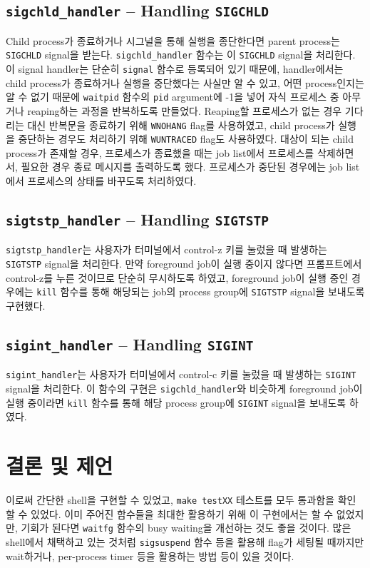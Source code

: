 \documentclass{scrartcl}
\begin{document}
\subsection{\texttt{sigchld\_handler} -- Handling \texttt{SIGCHLD}}
Child process가 종료하거나 시그널을 통해 실행을 종단한다면 parent process는
\texttt{SIGCHLD} signal을 받는다. \texttt{sigchld\_handler} 함수는 이
\texttt{SIGCHLD} signal을 처리한다. 이 signal handler는 단순히 \texttt{signal}
함수로 등록되어 있기 때문에, handler에서는 child process가 종료하거나 실행을
중단했다는 사실만 알 수 있고, 어떤 process인지는 알 수 없기 때문에
\texttt{waitpid} 함수의 \texttt{pid} argument에 -1을 넣어 자식 프로세스 중
아무거나 reaping하는 과정을 반복하도록 만들었다. Reaping할 프로세스가 없는 경우
기다리는 대신 반복문을 종료하기 위해 \texttt{WNOHANG} flag를 사용하였고, child
process가 실행을 중단하는 경우도 처리하기 위해 \texttt{WUNTRACED} flag도
사용하였다. 대상이 되는 child process가 존재할 경우, 프로세스가 종료했을 때는
job list에서 프로세스를 삭제하면서, 필요한 경우 종료 메시지를 출력하도록 했다.
프로세스가 중단된 경우에는 job list에서 프로세스의 상태를 바꾸도록 처리하였다.

\subsection{\texttt{sigtstp\_handler} -- Handling \texttt{SIGTSTP}}
\texttt{sigtstp\_handler}는 사용자가 터미널에서 control-z 키를 눌렀을 때
발생하는 \texttt{SIGTSTP} signal을 처리한다. 만약 foreground job이 실행 중이지
않다면 프롬프트에서 control-z를 누른 것이므로 단순히 무시하도록 하였고,
foreground job이 실행 중인 경우에는 \texttt{kill} 함수를 통해 해당되는 job의
process group에 \texttt{SIGTSTP} signal을 보내도록 구현했다.

\subsection{\texttt{sigint\_handler} -- Handling \texttt{SIGINT}}
\texttt{sigint\_handler}는 사용자가 터미널에서 control-c 키를 눌렀을 때
발생하는 \texttt{SIGINT} signal을 처리한다. 이 함수의 구현은
\texttt{sigchld\_handler}와 비슷하게 foreground job이 실행 중이라면
\texttt{kill} 함수를 통해 해당 process group에 \texttt{SIGINT} signal을
보내도록 하였다.

\section{결론 및 제언}
이로써 간단한 shell을 구현할 수 있었고, \texttt{make testXX} 테스트를 모두
통과함을 확인할 수 있었다. 이미 주어진 함수들을 최대한 활용하기 위해 이
구현에서는 할 수 없었지만, 기회가 된다면 \texttt{waitfg} 함수의 busy waiting을
개선하는 것도 좋을 것이다. 많은 shell에서 채택하고 있는 것처럼
\texttt{sigsuspend} 함수 등을 활용해 flag가 세팅될 때까지만 wait하거나,
per-process timer 등을 활용하는 방법 등이 있을 것이다.
\end{document}
